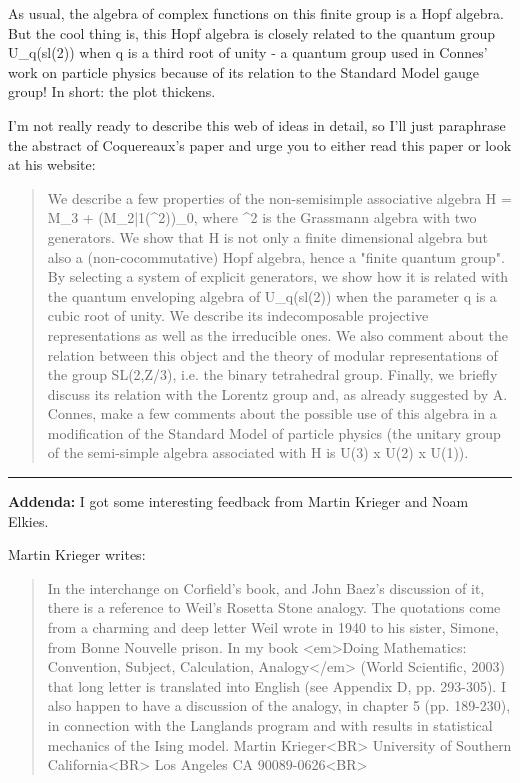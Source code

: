 As usual, the algebra of complex functions on this finite group
is a Hopf algebra.  But the cool thing is, this Hopf algebra is
closely related to the quantum group U_{q}(sl(2)) when q is a third
root of unity - a quantum group used in Connes' work on particle
physics because of its relation to the Standard Model gauge group!
In short: the plot thickens.

I'm not really ready to describe this web of ideas in detail,
so I'll just paraphrase the abstract of Coquereaux's paper and 
urge you to either read this paper or look at his website:

\begin{quote}
     We describe a few properties of the non-semisimple associative 
     algebra H = M_{3} + (M_{2|1}(\Lambda ^{2}))_{0}, where \Lambda ^{2} is 
     the Grassmann algebra with two generators.  We show that H 
     is not only a finite dimensional algebra but also a 
     (non-cocommutative) Hopf algebra, hence a "finite quantum 
     group". By selecting a system of explicit generators, we 
     show how it is related with the quantum enveloping algebra 
     of U_{q}(sl(2)) when the parameter q is a cubic root of unity.  
     We describe its indecomposable projective representations as 
     well as the irreducible ones. We also comment about the relation
     between this object and the theory of modular representations 
     of the group SL(2,Z/3), i.e. the binary tetrahedral group.  
     Finally, we briefly discuss its relation with the Lorentz group
     and, as already suggested by A. Connes, make a few comments 
     about the possible use of this algebra in a modification of 
     the Standard Model of particle physics (the unitary group of
     the semi-simple algebra associated with H is U(3) x U(2) x U(1)). 
\end{quote}

\par\noindent\rule{\textwidth}{0.4pt}
\textbf{Addenda:} I got some interesting feedback from Martin
Krieger and Noam Elkies.   

 Martin Krieger writes:

\begin{quote}
In the interchange on Corfield's book, and John Baez's discussion of it,
there is a reference to Weil's Rosetta Stone analogy. The quotations come
from a charming and deep letter Weil wrote in 1940 to his sister, Simone,
from Bonne Nouvelle prison. In my book <em>Doing Mathematics: Convention,
Subject, Calculation, Analogy</em> (World Scientific, 2003) that long letter is
translated into English (see Appendix D, pp. 293-305). I also happen to have
a discussion of the analogy, in chapter 5 (pp. 189-230), in connection with
the Langlands program and with results in statistical mechanics of the Ising
model.
Martin Krieger<BR>
University of Southern California<BR>
Los Angeles CA 90089-0626<BR>
\end{quote}

